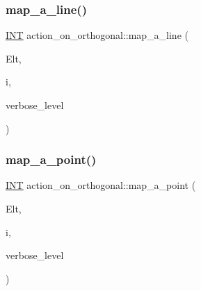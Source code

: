 \mbox{\label{classaction__on__orthogonal_ac7e41a4bbc9e0f2813f2f7030f3ed177}} 
\subsubsection{\texorpdfstring{map\+\_\+a\+\_\+line()}{map\_a\_line()}}
{\footnotesize\ttfamily \mbox{\hyperlink{galois_8h_a09fddde158a3a20bd2dcadb609de11dc}{I\+NT}} action\+\_\+on\+\_\+orthogonal\+::map\+\_\+a\+\_\+line (\begin{DoxyParamCaption}\item[{\mbox{\hyperlink{galois_8h_a09fddde158a3a20bd2dcadb609de11dc}{I\+NT}} $\ast$}]{Elt,  }\item[{\mbox{\hyperlink{galois_8h_a09fddde158a3a20bd2dcadb609de11dc}{I\+NT}}}]{i,  }\item[{\mbox{\hyperlink{galois_8h_a09fddde158a3a20bd2dcadb609de11dc}{I\+NT}}}]{verbose\+\_\+level }\end{DoxyParamCaption})}

\mbox{\label{classaction__on__orthogonal_a99224de62ef02d140676a31ac663a63b}} 
\subsubsection{\texorpdfstring{map\+\_\+a\+\_\+point()}{map\_a\_point()}}
{\footnotesize\ttfamily \mbox{\hyperlink{galois_8h_a09fddde158a3a20bd2dcadb609de11dc}{I\+NT}} action\+\_\+on\+\_\+orthogonal\+::map\+\_\+a\+\_\+point (\begin{DoxyParamCaption}\item[{\mbox{\hyperlink{galois_8h_a09fddde158a3a20bd2dcadb609de11dc}{I\+NT}} $\ast$}]{Elt,  }\item[{\mbox{\hyperlink{galois_8h_a09fddde158a3a20bd2dcadb609de11dc}{I\+NT}}}]{i,  }\item[{\mbox{\hyperlink{galois_8h_a09fddde158a3a20bd2dcadb609de11dc}{I\+NT}}}]{verbose\+\_\+level }\end{DoxyParamCaption})}

